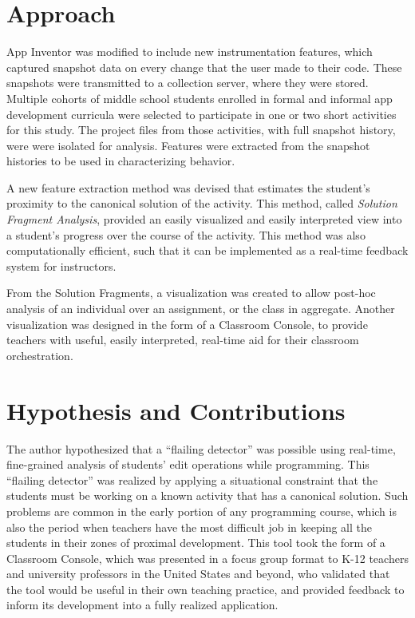 

\section{Approach}
App Inventor was modified to include new instrumentation features, which captured snapshot data on every change that the user made to their code. These snapshots were transmitted to a collection server, where they were stored. Multiple cohorts of middle school students enrolled in formal and informal app development curricula were selected to participate in one or two short activities for this study. The project files from those activities, with full snapshot history, were were isolated for analysis. Features were extracted from the snapshot histories to be used in characterizing behavior. %

A new feature extraction method was devised that estimates the student's proximity to the canonical solution of the activity. This method, called \emph{Solution Fragment Analysis}, provided an easily visualized and easily interpreted view into a student's progress over the course of the activity. This method was also computationally efficient, such that it can be implemented as a real-time feedback system for instructors.

From the Solution Fragments, a visualization was created to allow post-hoc analysis of an individual over an assignment, or the class in aggregate. Another visualization was designed in the form of a Classroom Console, to provide teachers with useful, easily interpreted, real-time aid for their classroom orchestration. 

\section{Hypothesis and Contributions}
The author hypothesized that a ``flailing detector'' was possible using real-time, fine-grained analysis of students' edit operations while programming. This ``flailing detector'' was realized by applying a situational constraint that the students must be working on a known activity that has a canonical solution. Such problems are common in the early portion of any programming course, which is also the period when teachers have the most difficult job in keeping all the students in their zones of proximal development. This tool took the form of a Classroom Console, which was presented in a focus group format to K-12 teachers and university professors in the United States and beyond, who validated that the tool would be useful in their own teaching practice, and provided feedback to inform its development into a fully realized application.

